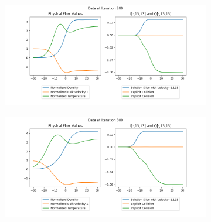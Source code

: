 \documentclass{article}
\begin{document}
\begin{figure}[H]
  
  \begin{subfigure}[b]{\textwidth}
  \includegraphics[width=\textwidth]{imgs/time_step/output_explicit/200.png}
  \end{subfigure}
  \hfill
  \begin{subfigure}[b]{\textwidth}
  \includegraphics[width=\textwidth]{imgs/time_step/output_explicit/300.png}
  \end{subfigure}
\end{figure}
\end{document}

